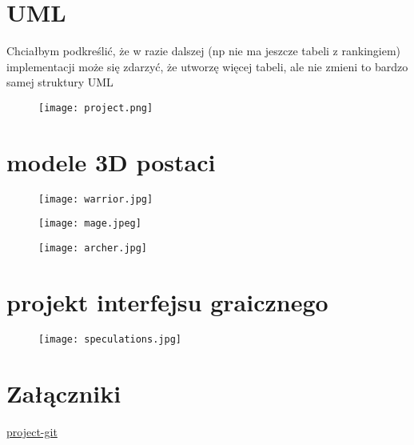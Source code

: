 \documentclass[11pt]{article}
\begin{document}
\begin{flushleft}
\section{UML}
Chciałbym podkreślić, że w razie dalszej (np nie ma jeszcze tabeli z rankingiem) implementacji może się zdarzyć, że utworzę więcej tabeli, ale nie zmieni to bardzo samej struktury UML
\begin{figure}[H]
  \begin{minipage}[b]{1.0\textwidth}
    \centering
    \texttt{[image: project.png]}
      \end{minipage}\hfill
    \end{figure}
\newpage
\section{modele 3D postaci}
\begin{figure}[H]
\begin{minipage}[b]{1.0\textwidth}
    \centering
    \texttt{[image: warrior.jpg]}
  \end{minipage}\hfill
      \begin{minipage}[b]{1.0\textwidth}
    \centering
    \texttt{[image: mage.jpeg]}
  \end{minipage}\hfill
      \begin{minipage}[b]{1.0\textwidth}
    \centering
    \texttt{[image: archer.jpg]}
  \end{minipage}\hfill
\end{figure}
\section{projekt interfejsu graicznego}
\begin{figure}[H]
\begin{minipage}[b]{1.0\textwidth}
    \centering
    \texttt{[image: speculations.jpg]}
  \end{minipage}\hfill
\end{figure}
\section{Załączniki}
\href{https://github.com/sqoshi/database-project}{project-git} 
\end{flushleft}
\end{document}
